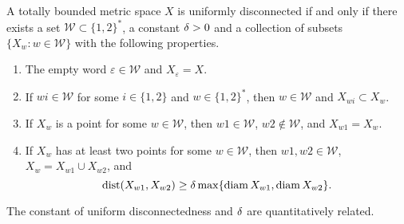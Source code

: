 \documentclass{amsart}
\DeclareMathOperator{\dist}{dist}
\begin{document}
\begin{lemma}\label{lem:UDreldist}
A totally bounded metric space $X$ is uniformly disconnected if and only if there exists a set $\mathcal{W}\subset \{1,2\}^*$, a constant $\delta>0$ and a collection of subsets $\{X_w :w\in\mathcal{W}\}$ with the following properties. 
\begin{enumerate}
\item The empty word $\varepsilon \in \mathcal{W}$ and $X_{\varepsilon} = X$.  
\item If $wi \in \mathcal{W}$ for some $i\in \{1,2\}$ and $w\in\{1,2\}^*$, then $w\in\mathcal{W}$ and $X_{wi}\subset X_w$.
\item If $X_w$ is a point for some $w\in\mathcal{W}$, then $w1\in\mathcal{W}$, $w2 \not\in\mathcal{W}$, and $X_{w1}=X_w$. 
\item If $X_w$ has at least two points for some $w\in\mathcal{W}$, then $w1,w2 \in \mathcal{W}$, $X_w = X_{w1} \cup X_{w2}$, and
\begin{equation}\label{eq:maxreldist}
\dist(X_{w1},X_{w2}) \geq\d \max\{\diam{X_{w1}}, \diam{X_{w2}}\}.
\end{equation}
\end{enumerate}
The constant of uniform disconnectedness and $\delta$ are quantitatively related.
\end{lemma}
\end{document}
